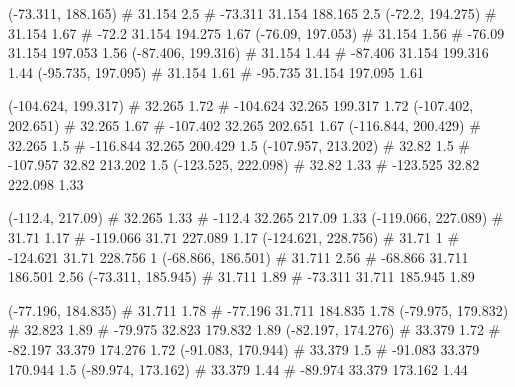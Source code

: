 \documentclass[a4paper,openbib,10pt]{article}
\newenvironment{treegraph}{\begin{graph}}{\end{graph}}
\begin{document}
\begin{treegraph}
  (-73.311, 188.165) #     31.154    2.5
   #    -73.311    31.154    188.165    2.5
  (-72.2, 194.275) #     31.154    1.67
   #    -72.2    31.154    194.275    1.67
  (-76.09, 197.053) #     31.154    1.56
   #    -76.09    31.154    197.053    1.56
  (-87.406, 199.316) #     31.154    1.44
   #    -87.406    31.154    199.316    1.44
  (-95.735, 197.095) #     31.154    1.61
   #    -95.735    31.154    197.095    1.61

  (-104.624, 199.317) #     32.265    1.72
   #    -104.624    32.265    199.317    1.72
  (-107.402, 202.651) #     32.265    1.67
   #    -107.402    32.265    202.651    1.67
  (-116.844, 200.429) #     32.265    1.5
   #    -116.844    32.265    200.429    1.5
  (-107.957, 213.202) #     32.82    1.5
   #    -107.957    32.82    213.202    1.5
  (-123.525, 222.098) #     32.82    1.33
   #    -123.525    32.82    222.098    1.33

  (-112.4, 217.09) #     32.265    1.33
   #    -112.4    32.265    217.09    1.33
  (-119.066, 227.089) #     31.71    1.17
   #    -119.066    31.71    227.089    1.17
  (-124.621, 228.756) #     31.71    1
   #    -124.621    31.71    228.756    1
  (-68.866, 186.501) #     31.711    2.56
   #    -68.866    31.711    186.501    2.56
  (-73.311, 185.945) #     31.711    1.89
   #    -73.311    31.711    185.945    1.89

  (-77.196, 184.835) #     31.711    1.78
   #    -77.196    31.711    184.835    1.78
  (-79.975, 179.832) #     32.823    1.89
   #    -79.975    32.823    179.832    1.89
  (-82.197, 174.276) #     33.379    1.72
   #    -82.197    33.379    174.276    1.72
  (-91.083, 170.944) #     33.379    1.5
   #    -91.083    33.379    170.944    1.5
  (-89.974, 173.162) #     33.379    1.44
   #    -89.974    33.379    173.162    1.44


\end{treegraph}
\end{document}
